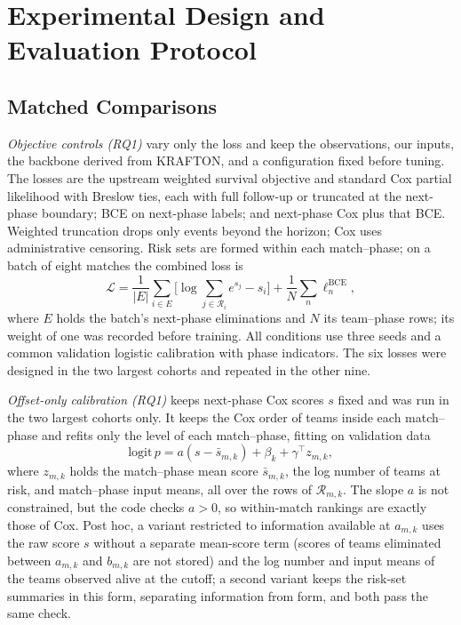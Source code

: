 \documentclass[sigconf,anonymous]{acmart}
\begin{document}
\section{Experimental Design and Evaluation Protocol}
\label{sec:method:evaluation}
\subsection{Matched Comparisons}
\label{sec:method:decomposition}
\emph{Objective controls (RQ1)} vary only the loss and keep the observations, our inputs, the backbone derived from KRAFTON, and a configuration fixed before tuning. The losses are the upstream weighted survival objective and standard Cox partial likelihood with Breslow ties, each with full follow-up or truncated at the next-phase boundary; BCE on next-phase labels; and next-phase Cox plus that BCE. Weighted truncation drops only events beyond the horizon; Cox uses administrative censoring. Risk sets are formed within each match--phase; on a batch of eight matches the combined loss is
\begin{equation}
\mathcal{L}=\frac{1}{|E|}\sum_{i\in E}\Big[\log\sum_{j\in\mathcal{R}_i}e^{s_j}-s_i\Big]+\frac{1}{N}\sum_{n}\ell^{\mathrm{BCE}}_n,
\label{eq:combined}
\end{equation}
where $E$ holds the batch's next-phase eliminations and $N$ its team--phase rows; its weight of one was recorded before training. All conditions use three seeds and a common validation logistic calibration with phase indicators. The six losses were designed in the two largest cohorts and repeated in the other nine.

\emph{Offset-only calibration (RQ1)} keeps next-phase Cox scores $s$ fixed and was run in the two largest cohorts only. It keeps the Cox order of teams inside each match--phase and refits only the level of each match--phase, fitting on validation data
\begin{equation}
\mathrm{logit}\,p=a(s-\bar s_{m,k})+\beta_k+\gamma^{\top}z_{m,k},
\label{eq:offset}
\end{equation}
where $z_{m,k}$ holds the match--phase mean score $\bar s_{m,k}$, the log number of teams at risk, and match--phase input means, all over the rows of $\mathcal{R}_{m,k}$. The slope $a$ is not constrained, but the code checks $a>0$, so within-match rankings are exactly those of Cox. Post hoc, a variant restricted to information available at $a_{m,k}$ uses the raw score $s$ without a separate mean-score term (scores of teams eliminated between $a_{m,k}$ and $b_{m,k}$ are not stored) and the log number and input means of the teams observed alive at the cutoff; a second variant keeps the risk-set summaries in this form, separating information from form, and both pass the same check.
\end{document}
